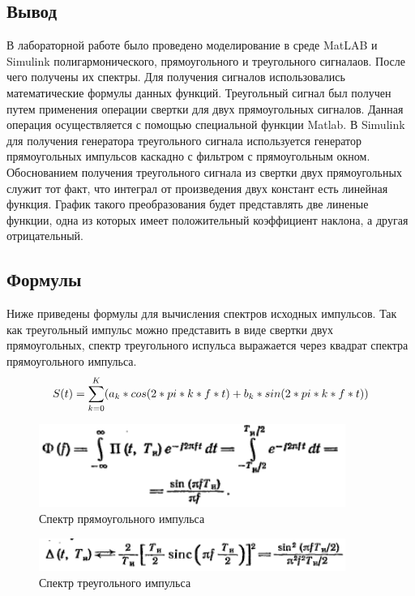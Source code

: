 \documentclass[10pt,a4paper]{article}
\begin{document}
\subsection{Вывод}
В лабораторной работе было проведено моделирование в среде MatLAB и Simulink полигармонического, прямоугольного и треугольного сигналаов. После чего получены их спектры. Для получения сигналов использовались математические формулы данных функций. Треугольный сигнал был получен путем применения операции свертки для двух прямоугольных сигналов. Данная операция осуществляется с помощью специальной функции Matlab. В Simulink для получения генератора треугольного сигнала используется генератор прямоугольных импульсов каскадно с фильтром с прямоугольным окном.\newline
Обоснованием получения треугольного сигнала из свертки двух прямоугольных служит тот факт, что интеграл от произведения двух констант есть линейная функция. График такого преобразования будет представлять две линеные функции, одна из которых имеет положительный коэффициент наклона, а другая отрицательный.
\subsection{Формулы}
Ниже приведены формулы для вычисления спектров исходных импульсов. Так как треугольный импульс можно представить в виде свертки двух прямоугольных, спектр треугольного испульса выражается через квадрат спектра прямоугольного импульса. 
\begin{displaymath}
S(t)=\sum \limits_{k=0}^{K}(a_{k}*cos(2*pi*k*f*t)+b_{k}*sin(2*pi*k*f*t))\newline
\end{displaymath}
\begin{figure}[h]
\centering
\includegraphics[width=10cm]{8.png} 
\caption{Спектр прямоугольного импульса} 
\end{figure}
\FloatBarrier
\begin{figure}[h]
\centering
\includegraphics[width=10cm]{9.png} 
\caption{Спектр треугольного импульса} 
\end{figure}
\end{document}
